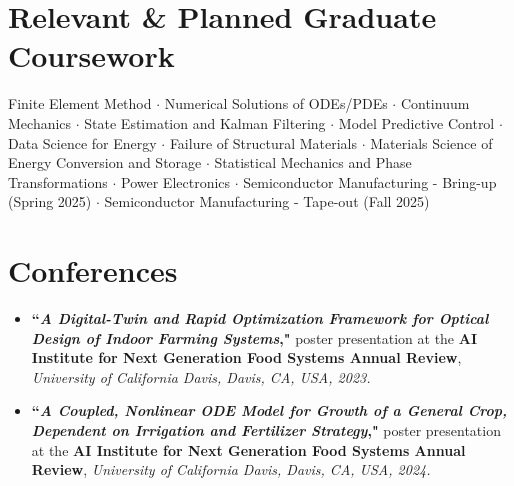 \documentclass[letterpaper,10.8pt]{article}
\newcommand{\resumeItemNoTitle}[2]{\item\small{\textbf{#1}{ #2 \vspace{-2pt}}}}
\newcommand{\resumeSubHeadingListStart}{\begin{itemize}[leftmargin=*]}
\newcommand{\resumeSubHeadingListEnd}{\end{itemize}}
\begin{document}
\section{Relevant \& Planned Graduate Coursework}
\small{
Finite Element Method $\cdot$ 
Numerical Solutions of ODEs/PDEs $\cdot$ 
Continuum Mechanics $\cdot$ 
State Estimation and Kalman Filtering  $\cdot$
Model Predictive Control  $\cdot$
Data Science for Energy $\cdot$
Failure of Structural Materials $\cdot$
Materials Science of Energy Conversion and Storage $\cdot$
Statistical Mechanics and Phase Transformations $\cdot$
Power Electronics $\cdot$
Semiconductor Manufacturing - Bring-up (Spring 2025) $\cdot$
Semiconductor Manufacturing - Tape-out (Fall 2025)
}

\section{Conferences}
\resumeSubHeadingListStart  
\resumeItemNoTitle{``\textit{A Digital-Twin and Rapid Optimization Framework for Optical Design of Indoor Farming Systems}," }{poster presentation at the \textbf{AI Institute for Next Generation Food Systems Annual Review}, \textit{University of California Davis, Davis, CA, USA, 2023.}}
\resumeItemNoTitle{``\textit{A Coupled, Nonlinear ODE Model for Growth of a General Crop, Dependent on Irrigation and Fertilizer Strategy}," }{poster presentation at the \textbf{AI Institute for Next Generation Food Systems Annual Review}, \textit{University of California Davis, Davis, CA, USA, 2024.}}
\resumeSubHeadingListEnd

\end{document}
